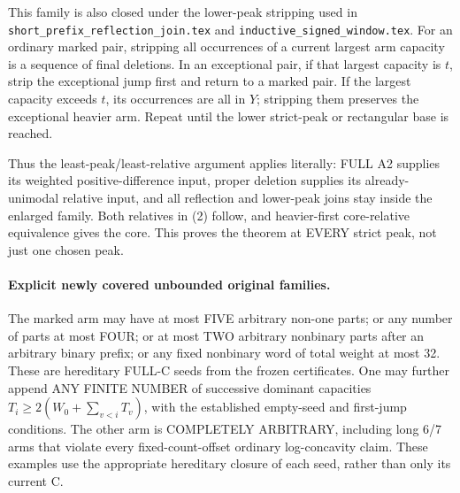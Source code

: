 This family is also closed under the lower-peak stripping used in
\texttt{short\_prefix\_reflection\_join.tex} and
\texttt{inductive\_signed\_window.tex}. For an ordinary marked pair,
stripping all occurrences of a current largest arm capacity is a
sequence of final deletions. In an exceptional pair, if that largest
capacity is $t$, strip the exceptional jump first and return to a
marked pair. If the largest capacity exceeds $t$, its occurrences
are all in $Y$; stripping them preserves the exceptional heavier arm.
Repeat until the lower strict-peak or rectangular base is reached.

Thus the least-peak/least-relative argument applies literally: FULL
A2 supplies its weighted positive-difference input, proper deletion
supplies its already-unimodal relative input, and all reflection and
lower-peak joins stay inside the enlarged family. Both relatives in
(2) follow, and heavier-first core-relative equivalence gives the core.
This proves the theorem at EVERY strict peak, not just one chosen peak.

\paragraph{Explicit newly covered unbounded original families.}
The marked arm may have at most FIVE arbitrary non-one parts; or any
number of parts at most FOUR; or at most TWO arbitrary nonbinary parts
after an arbitrary binary prefix; or any fixed nonbinary word of total
weight at most 32. These are hereditary FULL-C seeds from the frozen
certificates. One may further append ANY FINITE NUMBER of successive
dominant capacities $T_i\ge2(W_0+\sum_{v<i}T_v)$, with the established
empty-seed and first-jump conditions. The other arm is COMPLETELY
ARBITRARY, including long 6/7 arms that violate every fixed-count-offset
ordinary log-concavity claim. These examples use the appropriate
hereditary closure of each seed, rather than only its current C.


